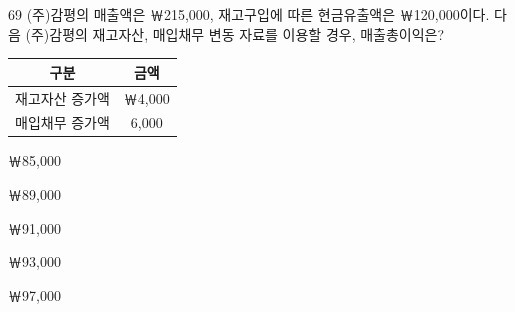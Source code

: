 \begin{question}{69}
(주)감평의 매출액은 ￦215,000, 재고구입에 따른 현금유출액은 ￦120,000이다. 다음 (주)감평의 재고자산, 매입채무 변동 자료를 이용할 경우, 매출총이익은?
\par{\small\centering\begin{tabular}{|c|c|}\hline
구분 & 금액 \\ \hline
재고자산 증가액 & ￦4,000 \\ \hline
매입채무 증가액 & 6,000 \\ \hline
\end{tabular}\par}
\begin{choices}
  \item ￦85,000
  \item ￦89,000
  \item ￦91,000
  \item ￦93,000
  \item ￦97,000
\end{choices}
\end{question}
